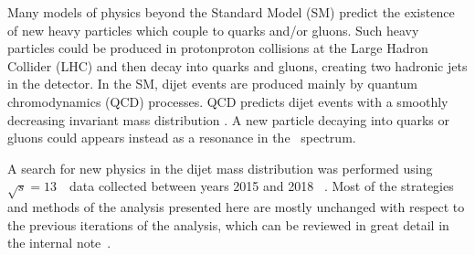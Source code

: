Many models of physics beyond the Standard Model (SM) predict the
existence of new heavy particles which couple to quarks and/or
gluons. 
Such heavy particles could be produced in proton\text{--}proton
collisions at the Large Hadron Collider (LHC) and then decay into
quarks and gluons, creating two hadronic jets in the detector. 
In the SM, dijet events are produced mainly by quantum chromodynamics
(QCD) processes. 
QCD predicts dijet events with a smoothly decreasing invariant mass
distribution \mjj. 
A new particle decaying into quarks or gluons could appears instead as
a resonance in the \mjj\ spectrum.  

A search for new physics in the dijet mass distribution was performed
using $\sqrt{s} = 13$~\TeV\ data collected between years 2015 and
2018~ \cite{EXOT-2019-03}. 
Most of the strategies and methods of the analysis presented here are
mostly unchanged with respect to the previous iterations of the
analysis, which can be reviewed in great detail in the internal
note~\cite{Nishu:2646455}.





